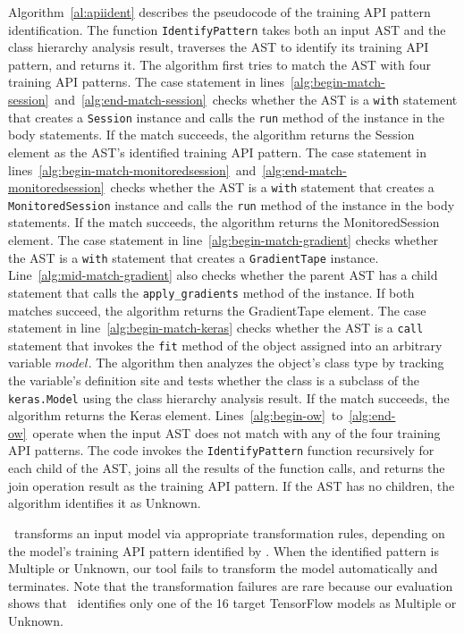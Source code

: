 Algorithm~\ref{al:apiident} describes the pseudocode of the training API
pattern identification.
The function {\tt IdentifyPattern} takes both an input AST and the class
hierarchy analysis result, traverses the AST to identify its training API
pattern, and returns it.
The algorithm first tries to match the AST with four training API patterns.
The case statement in
lines~\ref{alg:begin-match-session}~and~\ref{alg:end-match-session}~checks
whether the AST is a {\tt with} statement that creates a {\tt Session} instance
and calls the {\tt run} method of the instance in the body statements.  If the
match succeeds, the algorithm returns the Session element as the AST's
identified training API pattern.
The case statement in
lines~\ref{alg:begin-match-monitoredsession}~and~\ref{alg:end-match-monitoredsession}~checks
whether the AST is a {\tt with} statement that creates a {\tt MonitoredSession}
instance and calls the {\tt run} method of the instance in the body statements.
If the match succeeds, the algorithm returns the MonitoredSession element.
The case statement in line~\ref{alg:begin-match-gradient} checks whether the
AST is a {\tt with} statement that creates a {\tt GradientTape} instance.
Line~\ref{alg:mid-match-gradient} also checks whether the parent AST has a
child statement that calls the {\tt apply\_gradients} method of the instance.
If both matches succeed, the algorithm returns the GradientTape element.
The case statement in line~\ref{alg:begin-match-keras} checks whether the AST
is a {\tt call} statement that invokes the {\tt fit} method of the object
assigned into an arbitrary variable $model$.
The algorithm then analyzes the object's class type by tracking the variable's 
definition site and tests whether the class is a subclass of
the {\tt keras.Model} using the class hierarchy analysis result.
If the match succeeds, the algorithm returns the Keras element.
Lines~\ref{alg:begin-ow}~to~\ref{alg:end-ow}~operate when the input AST
does not match with any of the four training API patterns.
The code invokes the {\tt IdentifyPattern} function recursively for each child
of the AST, joins all the results of the function calls, and returns the join
operation result as the training API pattern.
If the AST has no children, the algorithm identifies it as Unknown.

\atran~transforms an input model via appropriate transformation rules,
depending on the model's training API pattern identified by \tapi.
When the identified pattern is Multiple or Unknown, our tool fails
to transform the model automatically and terminates. 
Note that the transformation failures are rare because our evaluation shows
that \tapi~identifies only one of the 16 target TensorFlow models as Multiple
or Unknown.

